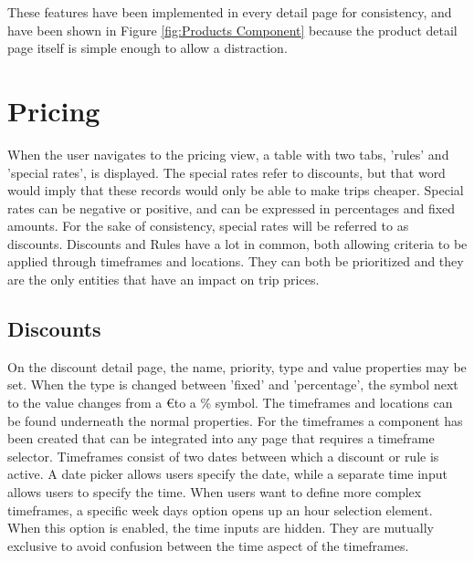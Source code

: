 These features have been implemented in every detail page for consistency, and have been shown in Figure \ref{fig:Products Component} because the product detail page itself is simple enough to allow a distraction.

\section{Pricing}
When the user navigates to the pricing view, a table with two tabs, 'rules' and 'special rates', is displayed. The special rates refer to discounts, but that word would imply that these records would only be able to make trips cheaper. Special rates can be negative or positive, and can be expressed in percentages and fixed amounts. For the sake of consistency, special rates will be referred to as discounts. Discounts and Rules have a lot in common, both allowing criteria to be applied through timeframes and locations. They can both be prioritized and they are the only entities that have an impact on trip prices.

\subsection{Discounts}
On the discount detail page, the name, priority, type and value properties may be set. When the type is changed between 'fixed' and 'percentage', the symbol next to the value changes from a \euro to a \% symbol. The timeframes and locations can be found underneath the normal properties. For the timeframes a component has been created that can be integrated into any page that requires a timeframe selector. Timeframes consist of two dates between which a discount or rule is active. A date picker allows users specify the date, while a separate time input allows users to specify the time. When users want to define more complex timeframes, a specific week days option opens up an hour selection element. When this option is enabled, the time inputs are hidden. They are mutually exclusive to avoid confusion between the time aspect of the timeframes.

